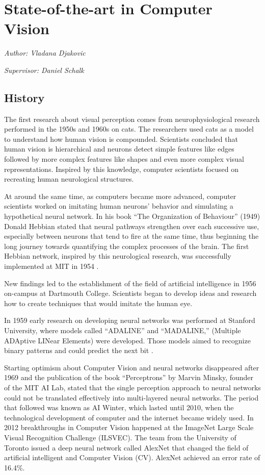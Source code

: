 \documentclass[
]{krantz}
\begin{document}
\hypertarget{c01-02-sota-cv}{%
\section{State-of-the-art in Computer Vision}\label{c01-02-sota-cv}}

\emph{Author: Vladana Djakovic}

\emph{Supervisor: Daniel Schalk}

\hypertarget{history}{%
\subsection{History}\label{history}}

The first research about visual perception comes from neurophysiological research performed in the 1950s and 1960s on cats. The researchers used cats as a model to understand how human vision is compounded. Scientists concluded that human vision is hierarchical and neurons detect simple features like edges followed by more complex features like shapes and even more complex visual representations. Inspired by this knowledge, computer scientists focused on recreating human neurological structures.

At around the same time, as computers became more advanced, computer scientists worked on imitating human neurons' behavior and simulating a hypothetical neural network. In his book ``The Organization of Behaviour'' (1949) Donald Hebbian stated that neural pathways strengthen over each successive use, especially between neurons that tend to fire at the same time, thus beginning the long journey towards quantifying the complex processes of the brain. The first Hebbian network, inspired by this neurological research, was successfully implemented at MIT in 1954 \citep{history1}.

New findings led to the establishment of the field of artificial intelligence in 1956 on-campus at Dartmouth College. Scientists began to develop ideas and research how to create techniques that would imitate the human eye.

In 1959 early research on developing neural networks was performed at Stanford University, where models called ``ADALINE'' and ``MADALINE,'' (Multiple ADAptive LINear Elements) were developed. Those models aimed to recognize binary patterns and could predict the next bit \citep{history2}.

Starting optimism about Computer Vision and neural networks disappeared after 1969 and the publication of the book ``Perceptrons'' by Marvin Minsky, founder of the MIT AI Lab, stated that the single perception approach to neural networks could not be translated effectively into multi-layered neural networks. The period that followed was known as AI Winter, which lasted until 2010, when the technological development of computer and the internet became widely used. In 2012 breakthroughs in Computer Vision happened at the ImageNet Large Scale Visual Recognition Challenge (ILSVEC). The team from the University of Toronto issued a deep neural network called AlexNet \citep{alexnet} that changed the field of artificial intelligent and Computer Vision (CV). AlexNet achieved an error rate of 16.4\%.
\end{document}
